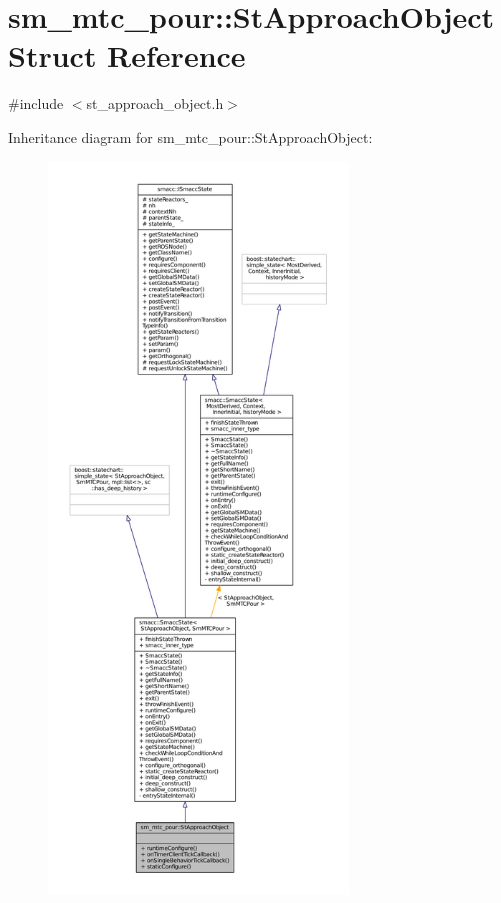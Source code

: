 \hypertarget{structsm__mtc__pour_1_1StApproachObject}{}\section{sm\+\_\+mtc\+\_\+pour\+:\+:St\+Approach\+Object Struct Reference}
\label{structsm__mtc__pour_1_1StApproachObject}


{\ttfamily \#include $<$st\+\_\+approach\+\_\+object.\+h$>$}



Inheritance diagram for sm\+\_\+mtc\+\_\+pour\+:\+:St\+Approach\+Object\+:
\nopagebreak
\begin{figure}[H]
\begin{center}
\leavevmode
\includegraphics[height=550pt]{structsm__mtc__pour_1_1StApproachObject__inherit__graph}
\end{center}
\end{figure}


